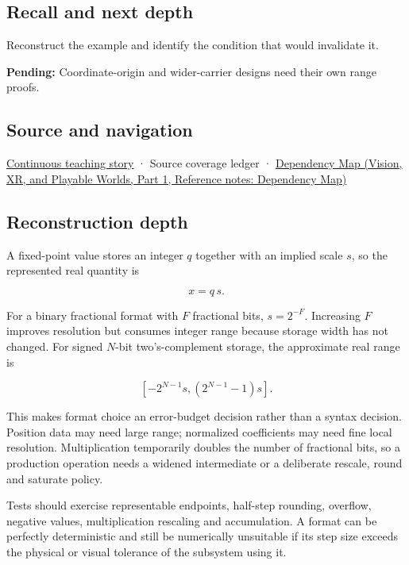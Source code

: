 \subsection{Recall and next depth}\label{appendix-ceb4c4a9b5a1-recall-and-next-depth}

\hypertarget{appendix-ceb4c4a9b5a1-recall-and-next-depth}{}

Reconstruct the example and identify the condition that would invalidate it.

\textbf{Pending:} Coordinate-origin and wider-carrier designs need their own range proofs.

\subsection{Source and navigation}\label{appendix-ceb4c4a9b5a1-source-and-navigation}

\hypertarget{appendix-ceb4c4a9b5a1-source-and-navigation}{}

\hyperref[01-foundations-i-ch001-choosing-what-information-to-keep]{Continuous teaching story} · {Source coverage ledger} · \href{../07-Vision-XR-and-Playable-Worlds-P01/main.pdf\#nameddest=appendix-4ad47bdd269a}{Dependency Map (Vision, XR, and Playable Worlds, Part 1, Reference notes: Dependency Map)}

\subsection{Reconstruction depth}\label{appendix-ceb4c4a9b5a1-reconstruction-depth}

\hypertarget{appendix-ceb4c4a9b5a1-reconstruction-depth}{}

A fixed-point value stores an integer \(q\) together with an implied scale \(s\), so the represented real quantity is

\[
x=q\,s.
\]

For a binary fractional format with \(F\) fractional bits, \(s=2^{-F}\). Increasing \(F\) improves resolution but consumes integer range because storage width has not changed. For signed \(N\)-bit two's-complement storage, the approximate real range is

\[
[-2^{N-1}s,(2^{N-1}-1)s].
\]

This makes format choice an error-budget decision rather than a syntax decision. Position data may need large range; normalized coefficients may need fine local resolution. Multiplication temporarily doubles the number of fractional bits, so a production operation needs a widened intermediate or a deliberate rescale, round and saturate policy.

Tests should exercise representable endpoints, half-step rounding, overflow, negative values, multiplication rescaling and accumulation. A format can be perfectly deterministic and still be numerically unsuitable if its step size exceeds the physical or visual tolerance of the subsystem using it.
